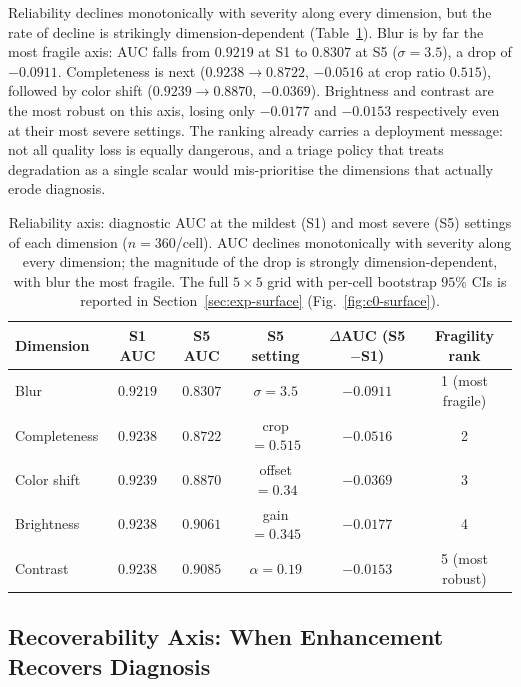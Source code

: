Reliability declines monotonically with severity along every dimension, but the rate of decline is strikingly dimension-dependent (Table~\ref{tab:c0-reliability}). Blur is by far the most fragile axis: AUC falls from $0.9219$ at S1 to $0.8307$ at S5 ($\sigma=3.5$), a drop of $-0.0911$. Completeness is next ($0.9238\!\to\!0.8722$, $-0.0516$ at crop ratio $0.515$), followed by color shift ($0.9239\!\to\!0.8870$, $-0.0369$). Brightness and contrast are the most robust on this axis, losing only $-0.0177$ and $-0.0153$ respectively even at their most severe settings. The ranking already carries a deployment message: not all quality loss is equally dangerous, and a triage policy that treats degradation as a single scalar would mis-prioritise the dimensions that actually erode diagnosis.

\begin{table}[t]
\centering
\caption{Reliability axis: diagnostic AUC at the mildest (S1) and most severe (S5) settings of each dimension ($n=360$/cell). AUC declines monotonically with severity along every dimension; the magnitude of the drop is strongly dimension-dependent, with blur the most fragile. The full $5\times5$ grid with per-cell bootstrap $95\%$ CIs is reported in Section~\ref{sec:exp-surface} (Fig.~\ref{fig:c0-surface}).}
\label{tab:c0-reliability}
\small
\begin{tabular}{lccccc}
\toprule
Dimension & S1 AUC & S5 AUC & S5 setting & $\Delta$AUC (S5$-$S1) & Fragility rank \\
\midrule
Blur         & $0.9219$ & $0.8307$ & $\sigma=3.5$       & $-0.0911$ & 1 (most fragile) \\
Completeness & $0.9238$ & $0.8722$ & crop $=0.515$      & $-0.0516$ & 2 \\
Color shift  & $0.9239$ & $0.8870$ & offset $=0.34$     & $-0.0369$ & 3 \\
Brightness   & $0.9238$ & $0.9061$ & gain $=0.345$      & $-0.0177$ & 4 \\
Contrast     & $0.9238$ & $0.9085$ & $\alpha=0.19$      & $-0.0153$ & 5 (most robust) \\
\bottomrule
\end{tabular}
\end{table}

\subsection{Recoverability Axis: When Enhancement Recovers Diagnosis}
\label{sec:recoverability-axis}

